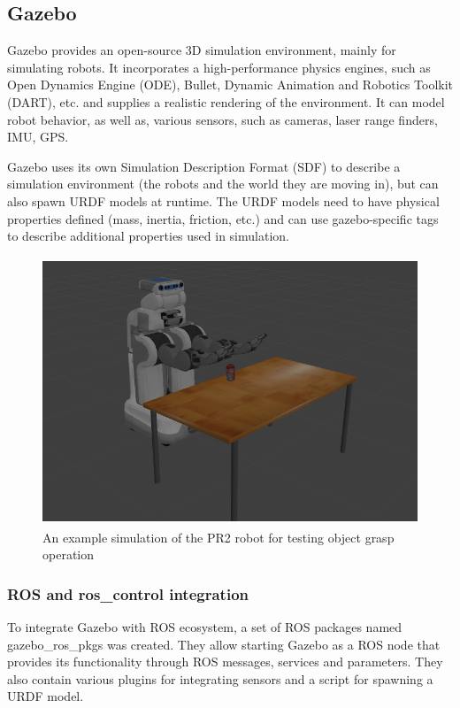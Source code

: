 \documentclass[english,inz,shortabstract]{iithesis}
\begin{document}
    

\pagebreak

    \subsection{Gazebo}
    Gazebo provides an open-source 3D simulation environment, mainly for simulating robots. It incorporates a high-performance physics engines, such as Open Dynamics Engine (ODE), Bullet, Dynamic Animation and Robotics Toolkit (DART), etc. and supplies a realistic rendering of the environment. It can model robot behavior, as well as, various sensors, such as cameras, laser range finders, IMU, GPS.

    Gazebo uses its own Simulation Description Format (SDF) to describe a simulation environment (the robots and the world they are moving in), but can also spawn URDF models at runtime. The URDF models need to have physical properties defined (mass, inertia, friction, etc.) and can use gazebo-specific tags to describe additional properties used in simulation.

    \begin{figure}[ht]
        \centering 
        \captionsetup{margin=2.5cm} 
        \includegraphics[height=8cm]{img/gazebo_pr2.png}
        \caption{An example simulation of the PR2 robot for testing object grasp operation}
        \label{fig:gazebo_pr2}
    \end{figure}

    \subsubsection{ROS and ros\_control integration}
    To integrate Gazebo with ROS ecosystem, a set of ROS packages named \textsf{gazebo\_ros\_pkgs} was created. They allow starting Gazebo as a ROS node that provides its functionality through ROS messages, services and parameters. They also contain various plugins for integrating sensors and a script for spawning a URDF model.
\end{document}
